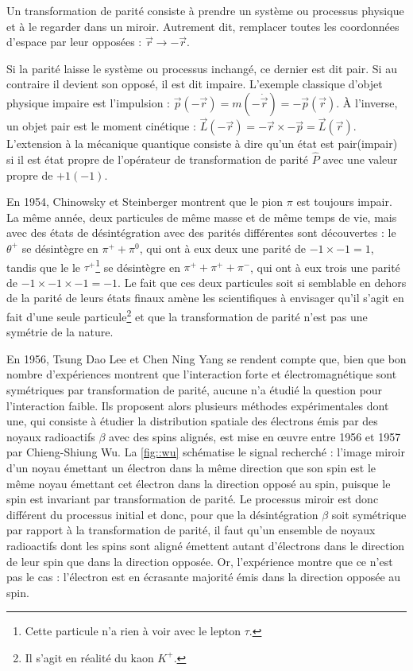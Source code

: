			Un transformation de parité consiste à prendre un système ou processus physique  et à le regarder dans un miroir. Autrement dit, remplacer toutes les coordonnées d'espace par leur opposées : $\Vec{r}\to-\Vec{r}$.
			
			Si la parité laisse le système ou processus inchangé, ce dernier est dit pair. Si au contraire il devient son opposé, il est dit impaire. L'exemple classique d'objet physique impaire est l'impulsion : $\Vec{p}(-\Vec{r}) = m(-\dot{\Vec{r}}) = -\Vec{p}(\Vec{r})$. À l'inverse, un objet pair est le moment cinétique : $\Vec{L}(-\Vec{r}) = -\Vec{r}\times -\Vec{p} = \Vec{L}(\Vec{r})$. L'extension à la mécanique quantique consiste à dire qu'un état est pair(impair) si il est état propre de l'opérateur de transformation de parité $\hat{P}$ avec une valeur propre de $+1(-1)$.
			
			En 1954, Chinowsky et Steinberger\cite{ref_needed} montrent que le pion $\pi$ est toujours impair. La même année, deux particules de même masse et de même temps de vie, mais avec des états de désintégration avec des parités différentes sont découvertes\cite{ref_needed} : le $\theta^+$ se désintègre en $\pi^+ + \pi^0$, qui ont à eux deux une parité de $-1\times-1=1$, tandis que le le $\tau^+$\footnote{Cette particule n'a rien à voir avec le lepton $\tau$.} se désintègre en $\pi^+ + \pi^+ + \pi^-$, qui ont à eux trois une parité de $-1\times-1\times-1=-1$. Le fait que ces deux particules soit si semblable en dehors de la parité de leurs états finaux amène les scientifiques à envisager qu'il s'agit en fait d'une seule particule\footnote{Il s'agit en réalité du kaon $K^+$.} et que la transformation de parité n'est pas une symétrie de la nature.
			
			En 1956, Tsung Dao Lee et Chen Ning Yang se rendent compte que, bien que bon nombre d'expériences montrent que l'interaction forte et électromagnétique sont symétriques par transformation de parité, aucune n'a étudié la question pour l'interaction faible. Ils proposent alors plusieurs méthodes expérimentales dont une, qui consiste à étudier la distribution spatiale des électrons émis par des noyaux radioactifs $\beta$ avec des spins alignés, est mise en œuvre entre 1956 et 1957 par Chieng-Shiung Wu. La \autoref{fig::wu} schématise le signal recherché : l'image miroir d'un noyau émettant un électron dans la même direction que son spin est le même noyau émettant cet électron dans la direction opposé au spin, puisque le spin est invariant par transformation de parité. Le processus miroir est donc différent du processus initial et donc, pour que la désintégration $\beta$ soit symétrique par rapport à la transformation de parité, il faut qu'un ensemble de noyaux radioactifs dont les spins sont aligné émettent autant d'électrons dans le direction de leur spin que dans la direction opposée. Or, l'expérience montre que ce n'est pas le cas : l'électron est en écrasante majorité émis dans la direction opposée au spin\cite{ref_needed}.
			
